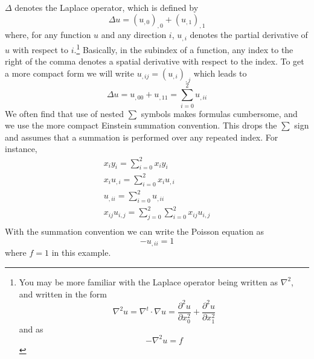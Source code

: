 $\Delta$ denotes the Laplace operator, which is defined by
\begin{equation}
\Delta u = (u_{,0})_{,0}+(u_{,1})_{,1}
\label{eq:FirstSteps.1.1}
\end{equation}
where, for any function $u$ and any direction $i$, $u_{,i}$
denotes the partial derivative  of $u$ with respect
to $i$.\footnote{You may be more familiar with the Laplace
operator being written as $\nabla^2$, and written in
the form
\begin{equation*}
    \nabla^2 u = \nabla^t \cdot \nabla u =  \frac{\partial^2 u}{\partial x_0^2} 
    + \frac{\partial^2 u}{\partial  x_1^2}
\end{equation*}
and  as
\begin{equation*}
    -\nabla^2 u = f
\end{equation*}
}
Basically, in the subindex of a function, any index to the right of the comma denotes a spatial derivative with respect 
to the index. To get a more compact form we will write $u_{,ij}=(u_{,i})_{,j}$
which leads to
\begin{equation}
\Delta u = u_{,00}+u_{,11}=\sum_{i=0}^2 u_{,ii}
\label{eq:FirstSteps.1.1b}
\end{equation}
We often find that use
of nested $\sum$ symbols makes formulas cumbersome, and we use the more
compact Einstein summation convention. This 
drops the $\sum$ sign and assumes that a summation is performed over any repeated index.
For instance, 
\begin{eqnarray}
x_{i}y_{i}=\sum_{i=0}^2 x_{i}y_{i}   \\
x_{i}u_{,i}=\sum_{i=0}^2 x_{i}u_{,i}   \\
u_{,ii}=\sum_{i=0}^2 u_{,ii} \\
x_{ij}u_{i,j}=\sum_{j=0}^2\sum_{i=0}^2 x_{ij}u_{i,j}   \\
\label{eq:FirstSteps.1.1c}
\end{eqnarray}
With the summation convention we can write the Poisson equation  as
\begin{equation}
- u_{,ii} =1 
\label{eq:FirstSteps.1.sum}
\end{equation}
where $f=1$ in this example.

